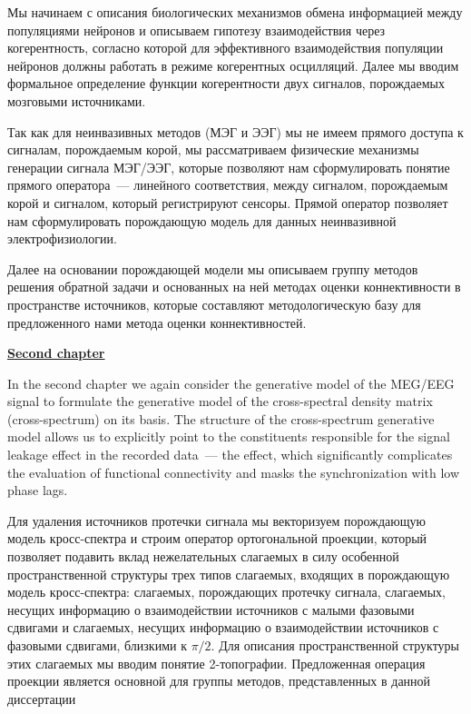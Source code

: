 Мы начинаем с описания биологических механизмов обмена информацией
между популяциями нейронов и описываем гипотезу взаимодействия через когерентность,
согласно которой для эффективного взаимодействия популяции нейронов должны работать
в режиме когерентных осцилляций. Далее мы вводим формальное определение функции когерентности
двух сигналов, порождаемых мозговыми источниками.

Так как для неинвазивных методов (МЭГ и ЭЭГ) мы не имеем прямого доступа к сигналам,
порождаемым корой, мы рассматриваем физические механизмы генерации сигнала МЭГ/ЭЭГ,
которые позволяют нам сформулировать понятие прямого оператора~--- линейного соответствия,
между сигналом, порождаемым корой и сигналом, который регистрируют сенсоры. Прямой
оператор позволяет нам сформулировать порождающую модель для данных неинвазивной электрофизиологии.

Далее на основании порождающей модели мы описываем группу методов решения обратной
задачи и основанных на ней методах оценки коннективности в пространстве источников,
которые составляют методологическую базу для предложенного нами метода оценки
коннективностей.




\underline{\textbf{Second chapter}}

In the second chapter we again consider the generative model of the MEG/EEG
signal to formulate the generative model of the cross-spectral density matrix
(cross-spectrum) on its basis. The structure of the cross-spectrum generative
model allows us to explicitly point to the constituents responsible for the
signal leakage effect in the recorded data~--- the effect, which
significantly complicates the evaluation of functional connectivity and masks
the synchronization with low phase lags.


Для удаления источников протечки сигнала мы векторизуем порождающую модель
кросс-спектра и строим оператор ортогональной проекции, который позволяет
подавить вклад нежелательных слагаемых в силу особенной пространственной
структуры трех типов слагаемых, входящих в порождающую модель кросс-спектра:
слагаемых, порождающих протечку сигнала, слагаемых, несущих информацию о
взаимодействии источников с малыми фазовыми сдвигами и слагаемых, несущих
информацию о взаимодействии источников с фазовыми сдвигами, близкими к $\pi/2$.
Для описания пространственной структуры этих слагаемых мы вводим понятие
2-топографии.  Предложенная операция проекции является основной для группы
методов, представленных в данной диссертации

